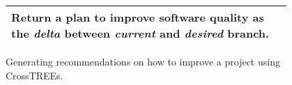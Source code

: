 \begin{figure}[htb!]
\begin{tabular}{|p{0.95\linewidth}|}
\begin{minipage}{\linewidth}
	 Return a plan to improve software quality as the  {\em delta} between {\em current} and {\em 
	 desired} branch. 
\end{minipage}\\\hline
\end{tabular}
\caption{Generating recommendations on how to improve a project using CrossTREEs.}\label{fig:crosstree}
\end{figure}
